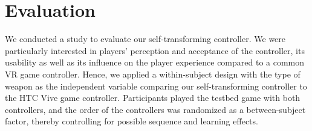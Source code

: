 \documentclass{sigchi}
\begin{document}
\section{Evaluation}
We conducted a study to evaluate our self-transforming controller. 
We were particularly interested in players' perception and acceptance of the controller, its usability as well as its influence on the player experience compared to a common VR game controller. 
Hence, we applied a within-subject design with the type of weapon as the independent variable comparing our self-transforming controller to the HTC Vive game controller. Participants played the testbed game with both controllers, and the order of the controllers was randomized as a between-subject factor, thereby controlling for possible sequence and learning effects.
\end{document}
